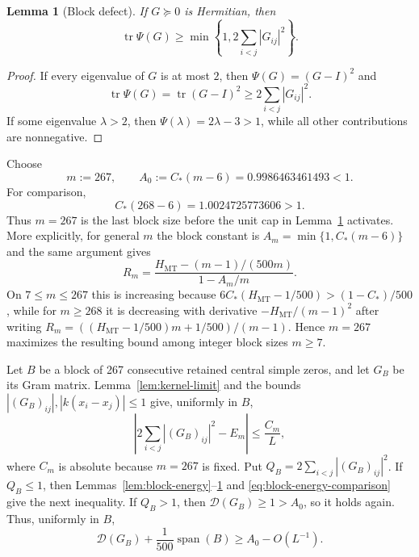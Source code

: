 \documentclass[11pt]{article}
\newtheorem{lemma}[theorem]{Lemma}
\DeclareMathOperator{\tr}{tr}
\DeclareMathOperator{\Span}{span}
\newcommand{\cD}{\mathcal D}
\newcommand{\MT}{\mathrm{MT}}
\begin{document}
\begin{lemma}[Block defect]\label{lem:block-defect}
If $G\succeq0$ is Hermitian, then
\begin{equation}\label{eq:block-defect}
 \tr\Psi(G)\ge
 \min\left\{1,2\sum_{i<j}|G_{ij}|^2\right\}.
\end{equation}
\end{lemma}

\begin{proof}
If every eigenvalue of $G$ is at most $2$, then
$\Psi(G)=(G-I)^2$ and
\[
 \tr\Psi(G)=\tr(G-I)^2
 \ge2\sum_{i<j}|G_{ij}|^2.
\]
If some eigenvalue $\lambda>2$, then $\Psi(\lambda)=2\lambda-3>1$, while
all other contributions are nonnegative.
\end{proof}

Choose
\begin{equation}\label{eq:m-A0}
 m:=267,
 \qquad A_0:=C_*(m-6)=0.9986463461493<1.
\end{equation}
For comparison,
\begin{equation}\label{eq:next-m}
 C_*(268-6)=1.0024725773606>1.
\end{equation}
Thus $m=267$ is the last block size before the unit cap in
Lemma~\ref{lem:block-defect} activates.  More explicitly, for general $m$
the block constant is $A_m=\min\{1,C_*(m-6)\}$ and the same argument gives
\[
 R_m=\frac{H_{\MT}-(m-1)/(500m)}{1-A_m/m}.
\]
On $7\le m\le267$ this is increasing because
$6C_*(H_{\MT}-1/500)>(1-C_*)/500$, while for $m\ge268$ it is decreasing
with derivative $-H_{\MT}/(m-1)^2$ after writing
$R_m=((H_{\MT}-1/500)m+1/500)/(m-1)$.  Hence $m=267$ maximizes the
resulting bound among integer block sizes $m\ge7$.

Let $B$ be a block of 267 consecutive retained central simple zeros, and let
$G_B$ be its Gram matrix.  Lemma~\ref{lem:kernel-limit} and the bounds
$|(G_B)_{ij}|,|k(x_i-x_j)|\le1$ give, uniformly in $B$,
\begin{equation}\label{eq:block-energy-comparison}
 \left|2\sum_{i<j}|(G_B)_{ij}|^2-E_m\right|
 \le\frac{C_m}{L},
\end{equation}
where $C_m$ is absolute because $m=267$ is fixed.  Put
$Q_B=2\sum_{i<j}|(G_B)_{ij}|^2$.  If $Q_B\le1$, then
Lemmas~\ref{lem:block-energy}--\ref{lem:block-defect} and
\eqref{eq:block-energy-comparison} give the next inequality.  If $Q_B>1$,
then $\cD(G_B)\ge1>A_0$, so it holds again.  Thus, uniformly in $B$,
\begin{equation}\label{eq:267-block}
 \cD(G_B)+\frac1{500}\Span(B)\ge A_0-O(L^{-1}).
\end{equation}
\end{document}
